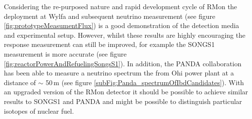 Considering the re-purposed nature and rapid development cycle of RMon the deployment at Wylfa and subsequent neutrino measurement (see figure \ref{fig:prototypeMeasumentFlux}) is a good demonstration of the detection media and experimental setup. However, whilst these results are highly encouraging the response measurement can still be improved, for example the SONGS1 measurement is more accurate (see figure \ref{fig:reactorPowerAndRefuelingSongsS1}). In addition, the PANDA collaboration has been able to measure a neutrino spectrum the from Ohi power plant at a distance of $\sim$ 50\,m \cite{IIRIE_Panda_2021} (see figure \ref{subFig:Panda_spectrumOfIbdCandidates}). With an upgraded version of the RMon detector it should be possible to achieve similar results to SONGS1 and PANDA and might be possible to distinguish particular isotopes of nuclear fuel.

